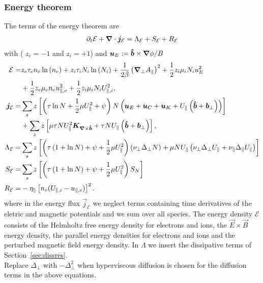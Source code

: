 \subsubsection{Energy theorem}
The terms of the energy theorem are
\begin{align} \label{eq:energy_theorem}
\partial_t \mathcal E +
{\boldsymbol{\nabla}}\cdot {\boldsymbol{j}}_{\mathcal E}
= \Lambda_{\mathcal E}
+  S_{\mathcal E}
+  R_{\mathcal E}
\end{align}
with ( $z_e=-1$ and $z_i=+1$) and ${\boldsymbol{u}}_E := {\bm{\hat{b}}\times {\boldsymbol{\nabla}}\phi}/{B}$
\begin{align} \label{eq:energy_conservation}
  \mathcal{E}= & z_e\tau_e n_e \ln{(n_e)} +z_i\tau_i N_i\ln{(N_i)}
  +\frac{1}{2\beta}\left({\boldsymbol{\nabla}}_{\perp} A_\parallel\right)^2
   +  \frac{1}{2} z_i \mu_i N_i u_E^2  \nonumber\\
   & +\frac{1}{2} z_e\mu_e  n_e u_{\parallel,e}^2
  +\frac{1}{2} z_i\mu_i  N_i U_{\parallel,i}^2,\\
  {\boldsymbol{j}}_{\mathcal E} =& \sum_s z\left[
  \left(\tau \ln N + \frac{1}{2}\mu U_\parallel^2 + \psi \right)N\left(
  {\boldsymbol{u}}_E + {\boldsymbol{u}}_C + {\boldsymbol{u}}_{K} +U_\parallel\left(\bm{\hat{b}}+{{\boldsymbol{b}}}_\perp\right)  \right) \right]
  \nonumber\\
  &+ \sum_z z\left[\mu \tau NU_\parallel^2{\boldsymbol{K}}_{{\boldsymbol{\nabla}}\times\bm{\hat{b}}} + \tau NU_\parallel \left(\bm{\hat{b}} + {{\boldsymbol{b}}}_\perp\right)\right], \\
  \Lambda_{\mathcal E} =&  \sum_s z\left[\left( \tau\left( 1+\ln{N}\right) + \psi + \frac{1}{2} \mu U_\parallel^2 \right)
  \left(\nu_\perp\Delta_\perp N \right)  +  \mu NU_\parallel\left(\nu_\perp\Delta_\perp U_\parallel + \nu_\parallel\Delta_\parallel U_\parallel\right) \right]
\nonumber \\
  S_{\mathcal E} =&  \sum_s  z\left[ \left(\tau\left( 1+\ln{N}\right) +\psi + \frac{1}{2} \mu U_\parallel^2 \right)S_{N}\right]
\nonumber \\
  R_{\mathcal E} =&  -\eta_\parallel  \left[ n_e(U_{\parallel,i}-u_{\parallel,e})\right]^2.
\end{align}
where in the energy flux $\vec j_{\mathcal E}$
we neglect terms  containing time derivatives
of the eletric and magnetic potentials and we sum over all species.
The energy density $\mathcal E$ consists of the Helmholtz free energy density for electrons and ions,
the \(\vec{E} \times \vec{B}\) energy density, the parallel energy densities for electrons and ions and the perturbed magnetic field energy density.
In \(\Lambda\) we insert the dissipative terms of Section~\ref{sec:dissres}. \\
Replace $\Delta_\perp$ with $-\Delta_\perp^2$ when hyperviscous diffusion is chosen
for the diffusion terms in the above equations.

